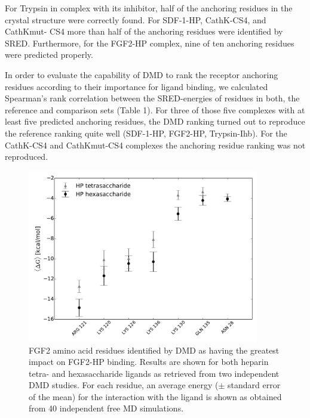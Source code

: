 For Trypsin in complex with its inhibitor, half of the anchoring residues in the
crystal structure were correctly found. For SDF-1-HP, CathK-CS4, and CathKmut-
CS4 more than half of the anchoring residues were identified by SRED.
Furthermore, for the FGF2-HP complex, nine of ten anchoring residues were
predicted properly.

In order to evaluate the capability of DMD to rank the receptor anchoring
residues according to their importance for ligand binding, we calculated
Spearman's rank correlation between the SRED-energies of residues in both, the
reference and comparison sets (Table 1). For three of those five complexes with
at least five predicted anchoring residues, the DMD ranking turned out to
reproduce the reference ranking quite well (SDF-1-HP, FGF2-HP, Trypsin-Ihb). For
the CathK-CS4 and CathKmut-CS4 complexes the anchoring residue ranking was not
reproduced.

\begin{figure}
\centering
\includegraphics[width=0.9\textwidth]{gfx/dmd/figure_6_receptor_top7_residues_of_top_40percent_dmd_runs.pdf}
\caption[]{
FGF2 amino acid residues identified by DMD as having the greatest impact on
FGF2-HP binding. Results are shown for both heparin tetra- and hexasaccharide
ligands as retrieved from two independent DMD studies. For each residue, an
average energy ($\pm$ standard error of the mean) for the interaction with the
ligand is shown as obtained from 40 independent free MD simulations.
}
\label{fig:dmd:sred_fgf2}
\end{figure}

